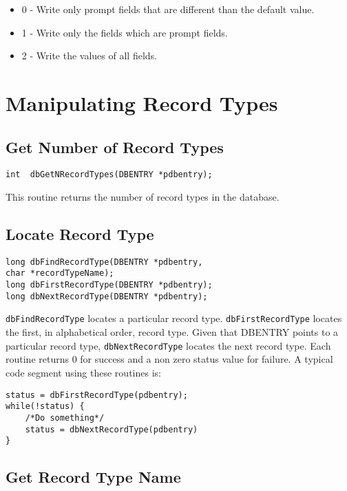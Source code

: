 \begin{itemize}
\item 0 - Write only prompt fields that are different than the default value.
\item 1 - Write only the fields which are prompt fields.
\item 2 - Write the values of all fields.
\end{itemize}

\section{Manipulating Record Types}

\subsection{Get Number of Record Types}

\begin{verbatim}
int  dbGetNRecordTypes(DBENTRY *pdbentry);
\end{verbatim}

This routine returns the number of record types in the database.

\subsection{Locate Record Type}

\begin{verbatim}
long dbFindRecordType(DBENTRY *pdbentry,
char *recordTypeName);
long dbFirstRecordType(DBENTRY *pdbentry);
long dbNextRecordType(DBENTRY *pdbentry);
\end{verbatim}

\verb|dbFindRecordType| locates a particular record type. \verb|dbFirstRecordType| locates the first, in alphabetical order, 
record type. Given that DBENTRY points to a particular record type, \verb|dbNextRecordType| locates the next record type. 
Each routine returns 0 for success and a non zero status value for failure. A typical code segment using these routines is:

\begin{verbatim}
status = dbFirstRecordType(pdbentry);
while(!status) {
    /*Do something*/
    status = dbNextRecordType(pdbentry)
}
\end{verbatim}

\subsection{Get Record Type Name}

